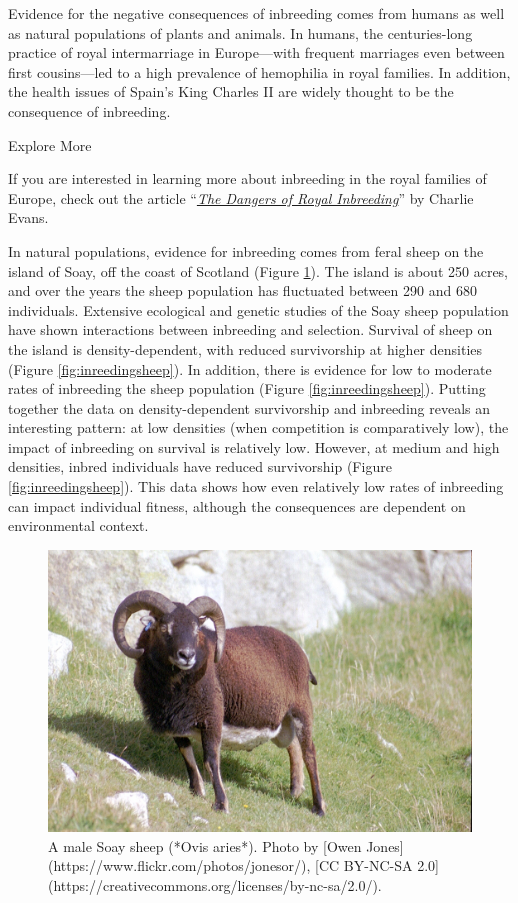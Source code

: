 \documentclass[
]{book}
\begin{document}
Evidence for the negative consequences of inbreeding comes from humans as well as natural populations of plants and animals. In humans, the centuries-long practice of royal intermarriage in Europe---with frequent marriages even between first cousins---led to a high prevalence of hemophilia in royal families. In addition, the health issues of Spain's King Charles II are widely thought to be the consequence of inbreeding.

Explore More

If you are interested in learning more about inbreeding in the royal families of Europe, check out the article ``\href{https://www.historyanswers.co.uk/kings-queens/the-dangers-of-royal-inbreeding/}{\emph{The Dangers of Royal Inbreeding}}'' by Charlie Evans.

In natural populations, evidence for inbreeding comes from feral sheep on the island of Soay, off the coast of Scotland (Figure \ref{fig:soay}). The island is about 250 acres, and over the years the sheep population has fluctuated between 290 and 680 individuals. Extensive ecological and genetic studies of the Soay sheep population have shown interactions between inbreeding and selection. Survival of sheep on the island is density-dependent, with reduced survivorship at higher densities (Figure \ref{fig:inreedingsheep}). In addition, there is evidence for low to moderate rates of inbreeding the sheep population (Figure \ref{fig:inreedingsheep}). Putting together the data on density-dependent survivorship and inbreeding reveals an interesting pattern: at low densities (when competition is comparatively low), the impact of inbreeding on survival is relatively low. However, at medium and high densities, inbred individuals have reduced survivorship (Figure \ref{fig:inreedingsheep}). This data shows how even relatively low rates of inbreeding can impact individual fitness, although the consequences are dependent on environmental context.

\begin{figure}
\includegraphics[width=1\linewidth]{images/soay} \caption{A male Soay sheep (*Ovis aries*). Photo by [Owen Jones](https://www.flickr.com/photos/jonesor/), [CC BY-NC-SA 2.0](https://creativecommons.org/licenses/by-nc-sa/2.0/).}\label{fig:soay}
\end{figure}
\end{document}
